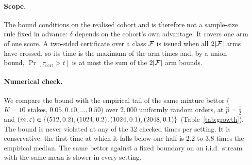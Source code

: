 \paragraph{Scope.} The bound conditions on the realised cohort and is therefore not a
sample-size rule fixed in advance: $\delta$ depends on the cohort's own advantage. It
covers one arm of one score. A two-sided certificate over a class $\mathcal{F}$ is issued when
all $2|\mathcal{F}|$ arms have crossed, so its time is the maximum of the arm times and, by a
union bound, $\Pr[\tau_{\mathrm{cert}}>t]$ is at most the sum of the $2|\mathcal{F}|$ arm
bounds.

\paragraph{Numerical check.} We compare the bound with the empirical tail of the same
mixture bettor ($K=10$ stakes, $0.05,0.10,\dots,0.50$) over $2{,}000$ uniformly random orders, at $\hat p=\frac12$
and $(m,\varepsilon)\in\{(512,0.2),(1024,0.2),(1024,0.1),(2048,0.1)\}$
(Table~\ref{tab:growth}). The bound is never violated at any of the $32$ checked times
per setting. It is conservative: the first time at which it falls below one half is
$2.2$ to $3.8$ times the empirical median. The same bettor against a fixed boundary on
an i.i.d.\ stream with the same mean is slower in every setting.

